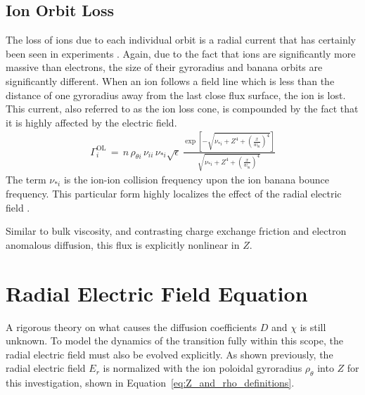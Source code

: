 \subsection{Ion Orbit Loss}\label{ssec:ol_loss}
The loss of ions due to each individual orbit is a radial current that has certainly been seen in experiments \cite{weisen_boundary_1991}.
Again, due to the fact that ions are significantly more massive than electrons, the size of their gyroradius and banana orbits are significantly different.
When an ion follows a field line which is less than the distance of one gyroradius away from the last close flux surface, the ion is lost.
This current, also referred to as the ion loss cone, is compounded by the fact that it is highly affected by the electric field.
\begin{align} %
	\Gamma_i^\text{OL} \,=\, n \, \rho_{\theta i} \, \nu_{ii} \, \nu_{*i}
		\sqrt{\epsilon} \, \frac{\exp\left[-\sqrt{\nu_{*i} + Z^4 +
		\left(\frac{x}{w_{bi}}\right)^4}\right]}{\sqrt{\nu_{*i} + Z^4 +
		\left(\frac{x}{w_{bi}}\right)^4}} \label{eq:Gamma_OL}
\end{align}
The term $\nu_{*i}$ is the ion-ion collision frequency upon the ion banana bounce frequency.%
This particular form highly localizes the effect of the radial electric field \cite{kobayashi_experimental_2016}.

Similar to bulk viscosity, and contrasting charge exchange friction and electron anomalous diffusion, this flux is explicitly nonlinear in $Z$.


\section{Radial Electric Field Equation}\label{sec:Z_equation}
A rigorous theory on what causes the diffusion coefficients $D$ and $\chi$ is still unknown.
To model the dynamics of the transition fully within this scope, the radial electric field must also be evolved explicitly.
As shown previously, the radial electric field $E_r$ is normalized with the ion poloidal gyroradius $\rho_\theta$ into $Z$ for this investigation, shown in Equation~\ref{eq:Z_and_rho_definitions}.

